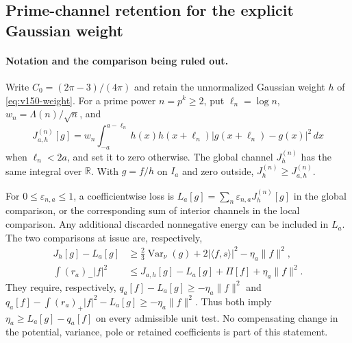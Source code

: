 \subsection*{Prime-channel retention for the explicit Gaussian weight}


\paragraph{Notation and the comparison being ruled out.}
Write $C_0=(2\pi-3)/(4\pi)$ and retain the unnormalized Gaussian weight
$h$ of \eqref{eq:v150-weight}. For a prime power $n=p^k\ge2$, put
$\ell_n=\log n$, $w_n=\Lambda(n)/\sqrt n$, and
\[
 J^{(n)}_{a,h}[g]
 =w_n\int_{-a}^{a-\ell_n}h(x)h(x+\ell_n)
                 |g(x+\ell_n)-g(x)|^2\,dx
\]
when $\ell_n<2a$, and set it to zero otherwise. The global channel
$J^{(n)}_h$ has the same integral over $\mathbb R$. With $g=f/h$ on
$I_a$ and zero outside, $J^{(n)}_h\ge J^{(n)}_{a,h}$.

For $0\le\varepsilon_{n,a}\le1$, a coefficientwise loss is
$L_a[g]=\sum_n\varepsilon_{n,a}J^{(n)}_h[g]$ in the global comparison,
or the corresponding sum of interior channels in the local comparison.
Any additional discarded nonnegative energy can be included in $L_a$.
The two comparisons at issue are, respectively,
\begin{align*}
 J_h[g]-L_a[g]&\ge\tfrac23\operatorname{Var}_\nu(g)
       +2|\langle f,s\rangle|^2-\eta_a\|f\|^2,\\
 \int(r_a)_-|f|^2&\le J_{a,h}[g]-L_a[g]+\Pi[f]
                                  +\eta_a\|f\|^2.
\end{align*}
They require, respectively, $q_a[f]-L_a[g]\ge-\eta_a\|f\|^2$
and $q_a[f]-\int(r_a)_+|f|^2-L_a[g]\ge-\eta_a\|f\|^2$.
Thus both imply $\eta_a\ge L_a[g]-q_a[f]$ on every admissible unit test.
No compensating change in the potential, variance, pole or retained
coefficients is part of this statement.

